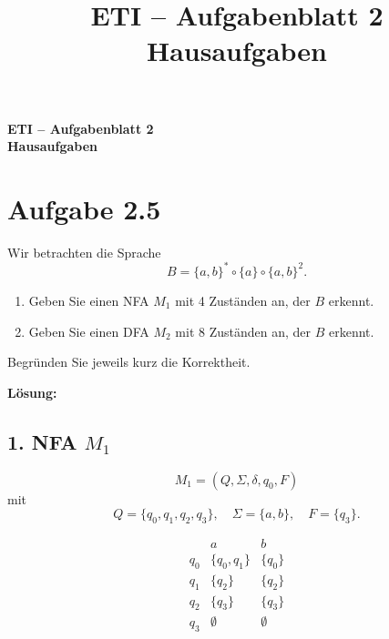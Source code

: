 \documentclass[a4paper,12pt]{article}
\title{ETI -- Aufgabenblatt 2 \\ Hausaufgaben}
\author{}
\date{}
\begin{document}
\raggedright
\setlength{\parindent}{0pt}

{\LARGE\bfseries ETI -- Aufgabenblatt 2 \\ Hausaufgaben\par}
\vspace{2em}

\section*{Aufgabe 2.5}

Wir betrachten die Sprache
\[
B = \{a,b\}^* \circ \{a\} \circ \{a,b\}^2.
\]

\begin{enumerate}
    \item Geben Sie einen NFA $M_1$ mit 4 Zuständen an, der $B$ erkennt.
    \item Geben Sie einen DFA $M_2$ mit 8 Zuständen an, der $B$ erkennt.
\end{enumerate}

Begründen Sie jeweils kurz die Korrektheit.

\medskip
\textbf{Lösung:}

\subsection*{1. NFA $M_1$}

\[
M_1=(Q,\Sigma,\delta,q_0,F)
\]
mit
\[
Q=\{q_0,q_1,q_2,q_3\},\quad \Sigma=\{a,b\},\quad F=\{q_3\}.
\]

\[
\begin{array}{c|cc}
 & a & b\\ \hline
q_0 & \{q_0,q_1\} & \{q_0\}\\
q_1 & \{q_2\} & \{q_2\}\\
q_2 & \{q_3\} & \{q_3\}\\
q_3 & \emptyset & \emptyset
\end{array}
\]

\begin{flushleft}
\end{flushleft}
\end{document}

